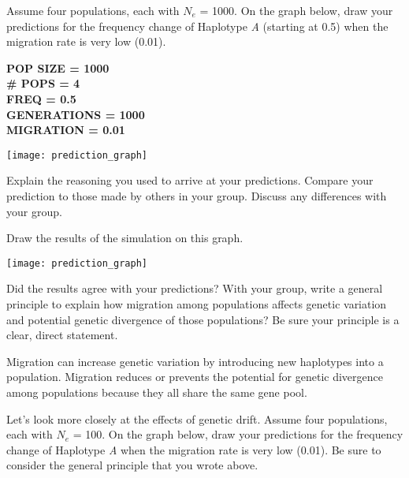 \documentclass[11pt, addpoints]{exam}
\begin{document}
\begin{questions}
\newpage

\question
Assume four populations, each with $N_e$ = 1000. On the graph below, 
draw your predictions for the frequency change of Haplotype \emph{A} 
(starting at 0.5) when the migration rate is very low (0.01).

\ifprintanswers
	{\bfseries %
	POP SIZE = 1000\\
	\# POPS = 4\\
	FREQ = 0.5\\
	GENERATIONS = 1000\\
	MIGRATION = 0.01 }\vspace*{16\baselineskip}
\else
	\begin{center}
		\texttt{[image: prediction\_graph]}
	\end{center}
\fi

\question[1]
Explain the reasoning you used to arrive at your predictions. Compare your 
prediction to those made by others in your group. Discuss any differences 
with your group.

\newpage

\question
Draw the results of the simulation on this graph.

\begin{center}
	\texttt{[image: prediction\_graph]}
\end{center}

\question[2]
Did the results agree with your predictions? With your
group, write a general principle to explain how migration among
populations affects genetic variation and potential genetic divergence
of those populations? Be sure your principle is a clear, direct
statement. 

\begin{solution}
Migration can increase genetic variation by introducing new haplotypes into a population.
Migration reduces or prevents the potential for genetic divergence among populations
because they all share the same gene pool.
\end{solution}

\newpage

\question
Let's look more closely at the effects of genetic drift.
Assume four populations, each with $N_e$ = 100. On
the graph below, draw your predictions for the frequency change of
Haplotype \emph{A} when the migration rate is very low (0.01). Be sure
to consider the general principle that you wrote above.


\end{questions}
\end{document}
